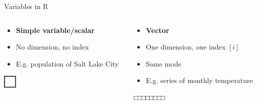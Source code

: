\documentclass[aspectratio=169]{beamer}\usepackage[]{graphicx}\usepackage[]{color}
\begin{document}
\begin{frame}{Variables in R}
\begin{columns}
  \begin{column}{0.50\textwidth}
		\begin{itemize}
  		\item \textbf{Simple variable/scalar}
		  \item No dimension, no index
		  \item E.g. population of Salt Lake City
		\end{itemize}
		\begin{center}
			\includegraphics[width=0.1\textwidth]{./images/nod_variable.png}
		\end{center}
	\end{column}
	\begin{column}{0.50\textwidth}
		\begin{itemize}
  		\item \textbf{Vector}
		  \item One dimension, one index $[i]$
		  \item Same mode
		  \item E.g. series of monthly temperature
		\end{itemize}
		\begin{center}
			\includegraphics[width=0.25\textwidth]{./images/1d_vector.png}
		\end{center}
	\end{column}
\end{columns}
\end{frame}
\end{document}
